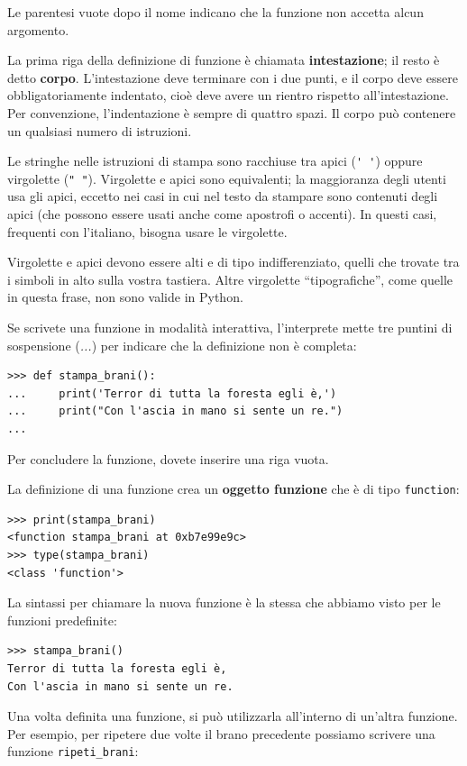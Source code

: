 \documentclass[10pt]{book}
\begin{document}
Le parentesi vuote dopo il nome indicano che la funzione non accetta alcun argomento.

La prima riga della definizione di funzione è chiamata {\bf intestazione};
il resto è detto {\bf corpo}. L'intestazione deve terminare con i due punti, e il corpo deve essere obbligatoriamente indentato, cioè deve avere un rientro rispetto all'intestazione. Per convenzione, l'indentazione è sempre di quattro spazi. Il corpo può contenere un qualsiasi numero di istruzioni.

Le stringhe nelle istruzioni di stampa sono racchiuse tra apici (\verb"' '") oppure virgolette (\verb'" "'). Virgolette e apici sono equivalenti; la maggioranza degli utenti usa gli apici, eccetto nei casi in cui nel testo da stampare sono contenuti degli apici (che possono essere usati anche come apostrofi o accenti). In questi casi, frequenti con l'italiano, bisogna usare le virgolette.

Virgolette e apici devono essere alti e di tipo indifferenziato, quelli che trovate tra i simboli in alto sulla vostra tastiera.  Altre virgolette ``tipografiche'', come quelle in questa frase, non sono valide in Python.

Se scrivete una funzione in modalità interattiva, l'interprete mette tre puntini di sospensione ({\em ...}) per indicare che la definizione non è completa:

\begin{verbatim}
>>> def stampa_brani():
...     print('Terror di tutta la foresta egli è,')
...     print("Con l'ascia in mano si sente un re.")
...
\end{verbatim}
%
Per concludere la funzione, dovete inserire una riga vuota.

La definizione di una funzione crea un {\bf oggetto funzione} che è di tipo \verb"function":

\begin{verbatim}
>>> print(stampa_brani)
<function stampa_brani at 0xb7e99e9c>
>>> type(stampa_brani)
<class 'function'>
\end{verbatim}
%

La sintassi per chiamare la nuova funzione è la stessa che abbiamo visto per le funzioni predefinite:

\begin{verbatim}
>>> stampa_brani()
Terror di tutta la foresta egli è,
Con l'ascia in mano si sente un re.
\end{verbatim}
%
Una volta definita una funzione, si può utilizzarla all'interno di un'altra funzione. Per esempio, per ripetere due volte il brano precedente possiamo scrivere una funzione \verb"ripeti_brani":
\end{document}

